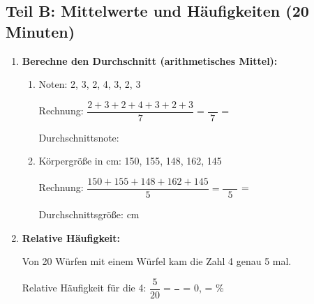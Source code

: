 \subsection*{Teil B: Mittelwerte und Häufigkeiten (20 Minuten)}

\begin{enumerate}[resume, label=\arabic*.]
    \item \textbf{Berechne den Durchschnitt (arithmetisches Mittel):}
    \begin{enumerate}[label=\alph*)]
        \item Noten: 2, 3, 2, 4, 3, 2, 3

        Rechnung: $\dfrac{2 + 3 + 2 + 4 + 3 + 2 + 3}{7} = \dfrac{\phantom{19}}{7}$ = \underline{\hspace{3cm}}

        Durchschnittsnote: \underline{\hspace{3cm}}

        \vspace{0.5cm}
        \item Körpergröße in cm: 150, 155, 148, 162, 145

        Rechnung: $\dfrac{150 + 155 + 148 + 162 + 145}{5} = \dfrac{\phantom{760}}{5}$ = \underline{\hspace{3cm}}

        Durchschnittsgröße: \underline{\hspace{3cm}} cm
    \end{enumerate}

    \vspace{0.5cm}

    \item \textbf{Relative Häufigkeit:} 

    Von 20 Würfen mit einem Würfel kam die Zahl 4 genau 5 mal.

    Relative Häufigkeit für die 4: $\dfrac{5}{20} = \dfrac{\phantom{1}}{\phantom{4}}$ = 0,\underline{\hspace{1cm}} = \underline{\hspace{2cm}}\%
\end{enumerate}